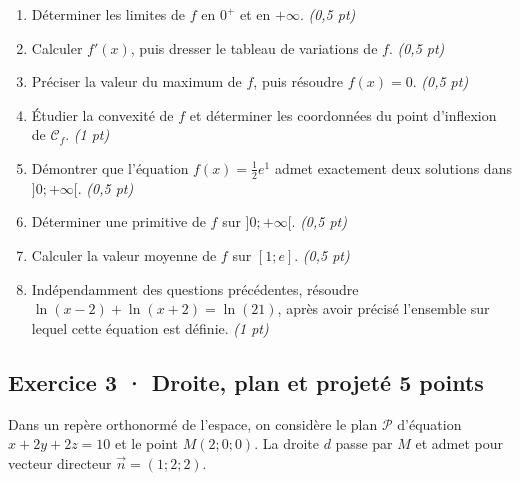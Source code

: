 \begin{enumerate}

\item Déterminer les limites de $f$ en $0^+$ et en $+\infty$. \hfill\textit{(0,5 pt)}

\item Calculer $f' (x)$, puis dresser le tableau de variations de $f$. \hfill\textit{(0,5 pt)}

\item Préciser la valeur du maximum de $f$, puis résoudre $f(x)=0$. \hfill\textit{(0,5 pt)}

\item Étudier la convexité de $f$ et déterminer les coordonnées du point d'inflexion de $\mathcal C_f$. \hfill\textit{(1 pt)}

\item Démontrer que l'équation $f(x)=\frac12 e^{1}$ admet exactement deux solutions dans $]0;+\infty[$. \hfill\textit{(0,5 pt)}

\item Déterminer une primitive de $f$ sur $]0;+\infty[$. \hfill\textit{(0,5 pt)}

\item Calculer la valeur moyenne de $f$ sur $[1;e]$. \hfill\textit{(0,5 pt)}

\item Indépendamment des questions précédentes, résoudre $\ln(x-2)+\ln(x+2)=\ln(21)$, après avoir précisé l'ensemble sur lequel cette équation est définie. \hfill\textit{(1 pt)}

\end{enumerate}

\clearpage{}\par

\subsection*{Exercice 3 · Droite, plan et projeté \hfill 5 points}Dans un repère orthonormé de l'espace, on considère le plan $\mathcal P$ d'équation $x+2y+2z=10$ et le point $M(2;0;0)$. La droite $d$ passe par $M$ et admet pour vecteur directeur $\vec n=(1;2;2)$.


